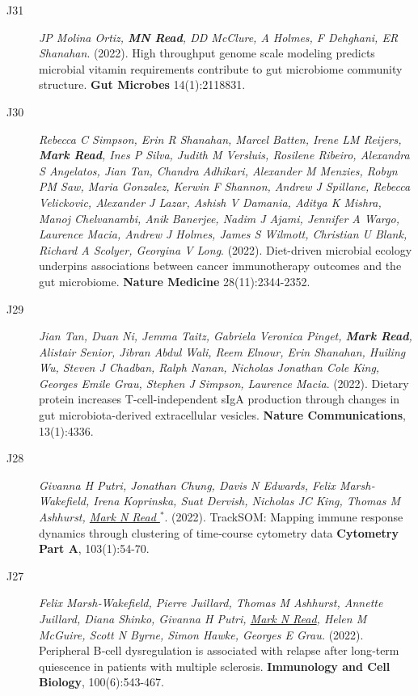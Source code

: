 \documentclass[a4paper]{article}
\begin{document}
\begin{description}


\item[J31]
\textit{JP Molina Ortiz, \textbf{MN Read}, DD McClure, A Holmes, F Dehghani, ER Shanahan}.
(2022).
High throughput genome scale modeling predicts microbial vitamin requirements contribute to gut microbiome community structure.
\textbf{Gut Microbes} 14(1):2118831.

\item[J30]
\textit{Rebecca C Simpson, Erin R Shanahan, Marcel Batten, Irene LM Reijers, \textbf{Mark Read}, Ines P Silva, Judith M Versluis, Rosilene Ribeiro, Alexandra S Angelatos, Jian Tan, Chandra Adhikari, Alexander M Menzies, Robyn PM Saw, Maria Gonzalez, Kerwin F Shannon, Andrew J Spillane, Rebecca Velickovic, Alexander J Lazar, Ashish V Damania, Aditya K Mishra, Manoj Chelvanambi, Anik Banerjee, Nadim J Ajami, Jennifer A Wargo, Laurence Macia, Andrew J Holmes, James S Wilmott, Christian U Blank, Richard A Scolyer, Georgina V Long}.
(2022).
Diet-driven microbial ecology underpins associations between cancer immunotherapy outcomes and the gut microbiome.
\textbf{Nature Medicine} 28(11):2344-2352.

\item[J29]
\textit{Jian Tan, Duan Ni, Jemma Taitz, Gabriela Veronica Pinget, \textbf{Mark Read}, Alistair Senior, Jibran Abdul Wali, Reem Elnour, Erin Shanahan, Huiling Wu, Steven J Chadban, Ralph Nanan, Nicholas Jonathan Cole King, Georges Emile Grau, Stephen J Simpson, Laurence Macia}.
(2022).
Dietary protein increases T-cell-independent sIgA production through changes in gut microbiota-derived extracellular vesicles.
\textbf{Nature Communications}, 13(1):4336.

\item[J28]
\textit{Givanna H Putri, Jonathan Chung, Davis N Edwards, Felix Marsh‐Wakefield, Irena Koprinska, Suat Dervish, Nicholas JC King, Thomas M Ashhurst, \underline{Mark N Read $^{*}$}}.
(2022).
TrackSOM: Mapping immune response dynamics through clustering of time‐course cytometry data
\textbf{Cytometry Part A}, 103(1):54-70.

\item[J27]
\textit{Felix Marsh‐Wakefield, Pierre Juillard, Thomas M Ashhurst, Annette Juillard, Diana Shinko, Givanna H Putri, \underline{Mark N Read}, Helen M McGuire, Scott N Byrne, Simon Hawke, Georges E Grau.}
(2022).
Peripheral B‐cell dysregulation is associated with relapse after long‐term quiescence in patients with multiple sclerosis.
\textbf{Immunology and Cell Biology}, 100(6):543-467.


\end{description}
\end{document}
